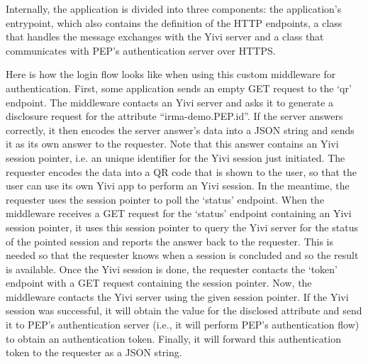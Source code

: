 \documentclass{report}
\begin{document}
Internally, the application is divided into three components: the application's entrypoint, which also contains the definition of the HTTP endpoints, a class that handles the
message exchanges with the Yivi server and a class that communicates with PEP's authentication server over HTTPS. \par
Here is how the login flow looks like when using this custom middleware for authentication. First, some application sends an empty GET request to the \enquote*{qr} endpoint. The
middleware contacts an Yivi server and asks it to generate a disclosure request for the attribute \enquote{irma-demo.PEP.id}. If the server answers
correctly, it then encodes the server answer's data into a JSON string and sends it as its own answer to the requester. Note that this answer contains an Yivi session pointer, i.e.
an unique identifier for the Yivi session just initiated. The requester encodes the data into a QR code that is shown to the user, so that the user can use its own Yivi app to
perform an Yivi session. In the meantime, the requester uses the session pointer to poll the \enquote*{status} endpoint. When the middleware receives a GET request for the
\enquote*{status} endpoint containing an Yivi session pointer, it uses this session pointer to query the Yivi server for the status of the pointed session and reports the answer
back to the requester. This is needed so that the requester knows when a session is concluded and so the result is available. Once the Yivi session is done, the requester contacts
the \enquote*{token} endpoint with a GET request containing the session pointer. Now, the middleware contacts the Yivi server using the given session pointer. If the Yivi session
was successful, it will obtain the value for the disclosed attribute and send it to PEP's authentication server (i.e., it will perform PEP's authentication flow) to obtain an authentication token. Finally, it will forward this authentication token to the requester as a JSON string.
\end{document}
